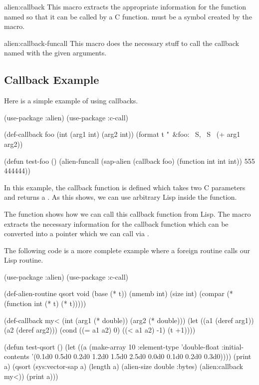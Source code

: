 \begin{defmac}{alien:}{callback}{}
  This macro extracts the appropriate information for the function
  named  so that it can be called by a C
  function.   must be a symbol created by the
   macro.
\end{defmac}

\begin{defmac}{alien:}{callback-funcall}{ \amprest
    }
  This macro does the necessary stuff to call the callback named
   with the given arguments.
\end{defmac}

\subsection{Callback Example}

Here is a simple example of using callbacks.
\begin{lisp}
(use-package :alien)
(use-package :c-call)

(def-callback foo (int (arg1 int) (arg2 int))
  (format t "~&foo: ~S, ~S~%
  (+ arg1 arg2))

(defun test-foo ()
  (alien-funcall (sap-alien (callback foo) (function int int int))
                 555 444444))
\end{lisp}

In this example, the callback function  is defined which
takes two C  parameters and returns a .  As this
shows, we can use arbitrary Lisp inside the function.

The function  shows how we can call this callback
function from Lisp.  The macro  extracts the necessary
information for the callback function  which can be
converted into a pointer which we can call via .

The following code is a more complete example where a foreign routine
calls our Lisp routine.
\begin{lisp}
(use-package :alien)
(use-package :c-call)

(def-alien-routine qsort void
  (base (* t))
  (nmemb int)
  (size int)
  (compar (* (function int (* t) (* t)))))

(def-callback my< (int (arg1 (* double))
                       (arg2 (* double)))
  (let ((a1 (deref arg1))
        (a2 (deref arg2)))
    (cond ((= a1 a2)  0)
          ((< a1 a2) -1)
          (t         +1))))

(defun test-qsort ()
  (let ((a (make-array 10 :element-type 'double-float
                       :initial-contents '(0.1d0 0.5d0 0.2d0 1.2d0 1.5d0
                                           2.5d0 0.0d0 0.1d0 0.2d0 0.3d0))))
    (print a)
    (qsort (sys:vector-sap a)
           (length a)
           (alien-size double :bytes)
           (alien:callback my<))
    (print a)))
\end{lisp}

